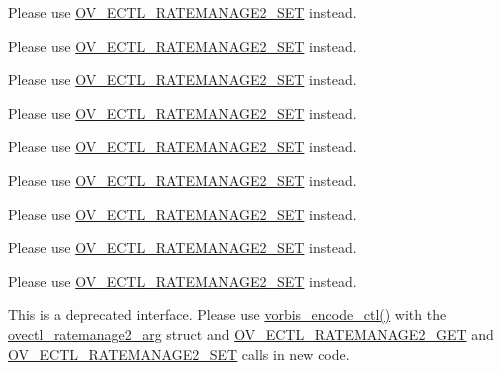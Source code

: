 \begin{DoxyRefList}
Please use \hyperlink{_2cocos2d_2external_2win32-specific_2OggDecoder_2include_2vorbis_2vorbisenc_8h_a5075e0acb85fd45398a290594f83d6ba}{O\+V\+\_\+\+E\+C\+T\+L\+\_\+\+R\+A\+T\+E\+M\+A\+N\+A\+G\+E2\+\_\+\+S\+ET} instead.

Please use \hyperlink{_2cocos2d_2external_2win32-specific_2OggDecoder_2include_2vorbis_2vorbisenc_8h_a5075e0acb85fd45398a290594f83d6ba}{O\+V\+\_\+\+E\+C\+T\+L\+\_\+\+R\+A\+T\+E\+M\+A\+N\+A\+G\+E2\+\_\+\+S\+ET} instead.

Please use \hyperlink{_2cocos2d_2external_2win32-specific_2OggDecoder_2include_2vorbis_2vorbisenc_8h_a5075e0acb85fd45398a290594f83d6ba}{O\+V\+\_\+\+E\+C\+T\+L\+\_\+\+R\+A\+T\+E\+M\+A\+N\+A\+G\+E2\+\_\+\+S\+ET} instead.

Please use \hyperlink{_2cocos2d_2external_2win32-specific_2OggDecoder_2include_2vorbis_2vorbisenc_8h_a5075e0acb85fd45398a290594f83d6ba}{O\+V\+\_\+\+E\+C\+T\+L\+\_\+\+R\+A\+T\+E\+M\+A\+N\+A\+G\+E2\+\_\+\+S\+ET} instead.

Please use \hyperlink{_2cocos2d_2external_2win32-specific_2OggDecoder_2include_2vorbis_2vorbisenc_8h_a5075e0acb85fd45398a290594f83d6ba}{O\+V\+\_\+\+E\+C\+T\+L\+\_\+\+R\+A\+T\+E\+M\+A\+N\+A\+G\+E2\+\_\+\+S\+ET} instead.

Please use \hyperlink{_2cocos2d_2external_2win32-specific_2OggDecoder_2include_2vorbis_2vorbisenc_8h_a5075e0acb85fd45398a290594f83d6ba}{O\+V\+\_\+\+E\+C\+T\+L\+\_\+\+R\+A\+T\+E\+M\+A\+N\+A\+G\+E2\+\_\+\+S\+ET} instead.

Please use \hyperlink{_2cocos2d_2external_2win32-specific_2OggDecoder_2include_2vorbis_2vorbisenc_8h_a5075e0acb85fd45398a290594f83d6ba}{O\+V\+\_\+\+E\+C\+T\+L\+\_\+\+R\+A\+T\+E\+M\+A\+N\+A\+G\+E2\+\_\+\+S\+ET} instead.

Please use \hyperlink{_2cocos2d_2external_2win32-specific_2OggDecoder_2include_2vorbis_2vorbisenc_8h_a5075e0acb85fd45398a290594f83d6ba}{O\+V\+\_\+\+E\+C\+T\+L\+\_\+\+R\+A\+T\+E\+M\+A\+N\+A\+G\+E2\+\_\+\+S\+ET} instead.

Please use \hyperlink{_2cocos2d_2external_2win32-specific_2OggDecoder_2include_2vorbis_2vorbisenc_8h_a5075e0acb85fd45398a290594f83d6ba}{O\+V\+\_\+\+E\+C\+T\+L\+\_\+\+R\+A\+T\+E\+M\+A\+N\+A\+G\+E2\+\_\+\+S\+ET} instead. 
\item[\label{deprecated__deprecated000181}%
\Hypertarget{deprecated__deprecated000181}%
Class \hyperlink{structovectl__ratemanage__arg}{ovectl\+\_\+ratemanage\+\_\+arg} ]This is a deprecated interface. Please use \hyperlink{cocos2d_2external_2win10-specific_2OggDecoder_2include_2vorbis_2vorbisenc_8h_a5f398a378e20b8ce5e3341a582e773bd}{vorbis\+\_\+encode\+\_\+ctl()} with the \hyperlink{structovectl__ratemanage2__arg}{ovectl\+\_\+ratemanage2\+\_\+arg} struct and \hyperlink{_2cocos2d_2external_2win32-specific_2OggDecoder_2include_2vorbis_2vorbisenc_8h_af95048070bedb467f80ce85e20057126}{O\+V\+\_\+\+E\+C\+T\+L\+\_\+\+R\+A\+T\+E\+M\+A\+N\+A\+G\+E2\+\_\+\+G\+ET} and \hyperlink{_2cocos2d_2external_2win32-specific_2OggDecoder_2include_2vorbis_2vorbisenc_8h_a5075e0acb85fd45398a290594f83d6ba}{O\+V\+\_\+\+E\+C\+T\+L\+\_\+\+R\+A\+T\+E\+M\+A\+N\+A\+G\+E2\+\_\+\+S\+ET} calls in new code.


\end{DoxyRefList}
